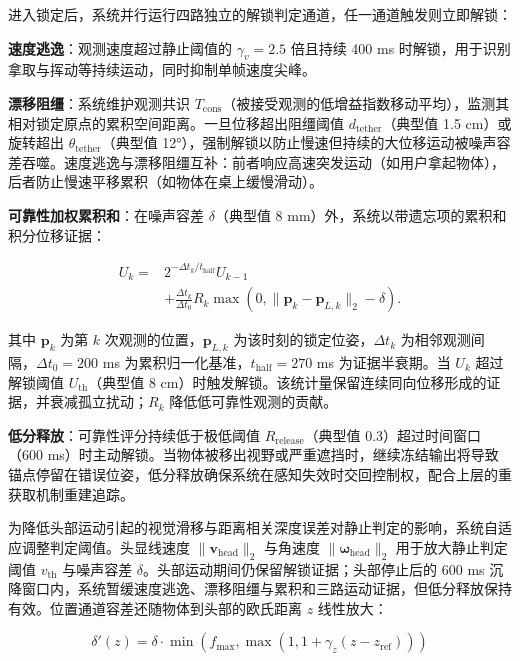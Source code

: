 \documentclass[review]{vgtc}
\begin{document}
进入锁定后，系统并行运行四路独立的解锁判定通道，任一通道触发则立即解锁：

\textbf{速度逃逸}：观测速度超过静止阈值的 $\gamma_v = 2.5$ 倍且持续 400 ms 时解锁，用于识别拿取与挥动等持续运动，同时抑制单帧速度尖峰。

\textbf{漂移阻缰}：系统维护观测共识 $T_{\mathrm{cons}}$（被接受观测的低增益指数移动平均），监测其相对锁定原点的累积空间距离。一旦位移超出阻缰阈值 $d_{\mathrm{tether}}$（典型值 1.5 cm）或旋转超出 $\theta_{\mathrm{tether}}$（典型值 12°），强制解锁以防止慢速但持续的大位移运动被噪声容差吞噬。速度逃逸与漂移阻缰互补：前者响应高速突发运动（如用户拿起物体），后者防止慢速平移累积（如物体在桌上缓慢滑动）。

\textbf{可靠性加权累积和}：在噪声容差 $\delta$（典型值 8 mm）外，系统以带遗忘项的累积和积分位移证据：

\begin{equation}
\begin{aligned}
U_k ={}& 2^{-\Delta t_k/t_{\mathrm{half}}}U_{k-1} \\
&+ \frac{\Delta t_k}{\Delta t_0}R_k
\max\!\left(0,\lVert \mathbf{p}_k-\mathbf{p}_{L,k}\rVert_2-\delta\right).
\end{aligned}
\label{eq:cusum}
\end{equation}


其中 $\mathbf{p}_k$ 为第 $k$ 次观测的位置，$\mathbf{p}_{L,k}$ 为该时刻的锁定位姿，$\Delta t_k$ 为相邻观测间隔，$\Delta t_0 = 200$ ms 为累积归一化基准，$t_{\mathrm{half}} = 270$ ms 为证据半衰期。当 $U_k$ 超过解锁阈值 $U_{\mathrm{th}}$（典型值 8 cm）时触发解锁。该统计量保留连续同向位移形成的证据，并衰减孤立扰动；$R_k$ 降低低可靠性观测的贡献。

\textbf{低分释放}：可靠性评分持续低于极低阈值 $R_{\mathrm{release}}$（典型值 0.3）超过时间窗口（600 ms）时主动解锁。当物体被移出视野或严重遮挡时，继续冻结输出将导致锚点停留在错误位姿，低分释放确保系统在感知失效时交回控制权，配合上层的重获取机制重建追踪。

为降低头部运动引起的视觉滑移与距离相关深度误差对静止判定的影响，系统自适应调整判定阈值。头显线速度 $\lVert \mathbf{v}_{\mathrm{head}} \rVert_2$ 与角速度 $\lVert \mathbf{\omega}_{\mathrm{head}} \rVert_2$ 用于放大静止判定阈值 $v_{\mathrm{th}}$ 与噪声容差 $\delta$。头部运动期间仍保留解锁证据；头部停止后的 600 ms 沉降窗口内，系统暂缓速度逃逸、漂移阻缰与累积和三路运动证据，但低分释放保持有效。位置通道容差还随物体到头部的欧氏距离 $z$ 线性放大：

\begin{equation}
\delta'(z) = \delta \cdot \min\!\left(f_{\mathrm{max}}, \max\!\left(1, 1 + \gamma_z (z - z_{\mathrm{ref}})\right)\right)
\label{eq:distance-adaptive}
\end{equation}
\end{document}
